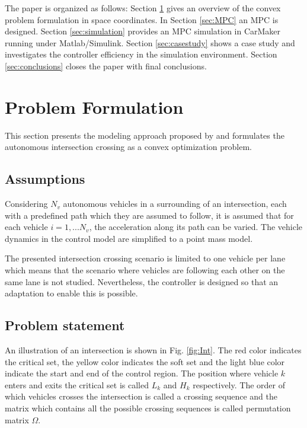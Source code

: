 \documentclass[letterpaper,10pt,conference]{ieeeconf}
\begin{document}
The paper is organized as follows: Section \ref{sec:problem_formulation} gives an overview of the convex problem formulation in space coordinates. In Section \ref{sec:MPC} an MPC is designed. Section \ref{sec:simulation} provides an MPC simulation in CarMaker running under Matlab/Simulink. Section \ref{sec:casestudy} shows a case study and investigates the controller efficiency in the simulation environment. Section \ref{sec:conclusions} closes the paper with final conclusions.

\section{Problem Formulation} \label{sec:problem_formulation}
This section presents the modeling approach proposed by \cite{nikolce} and formulates the autonomous intersection crossing as a convex optimization problem.

\subsection{Assumptions}
Considering $N_v$ autonomous vehicles in a surrounding of an intersection, each with a predefined path which they are assumed to follow, it is assumed that for each vehicle $i=1,...N_v$, the acceleration along its path can be varied. The vehicle dynamics in the control model are simplified to a point mass model.

The presented intersection crossing scenario is limited to one vehicle per lane which means that the scenario where vehicles are following each other on the same lane is not studied. Nevertheless, the controller is designed so that an adaptation to enable this is possible.

\subsection{Problem statement}

An illustration of an intersection is shown in Fig. \ref{fig:Int}. The red color indicates the critical set, the yellow color indicates the soft set and the light blue color indicate the start and end of the control region. The position where vehicle $k$ enters and exits the critical set is called $L_k$ and $H_k$ respectively. The order of which vehicles crosses the intersection is called a crossing sequence and the matrix which contains all the possible crossing sequences is called permutation matrix  $\Omega$.
\end{document}
